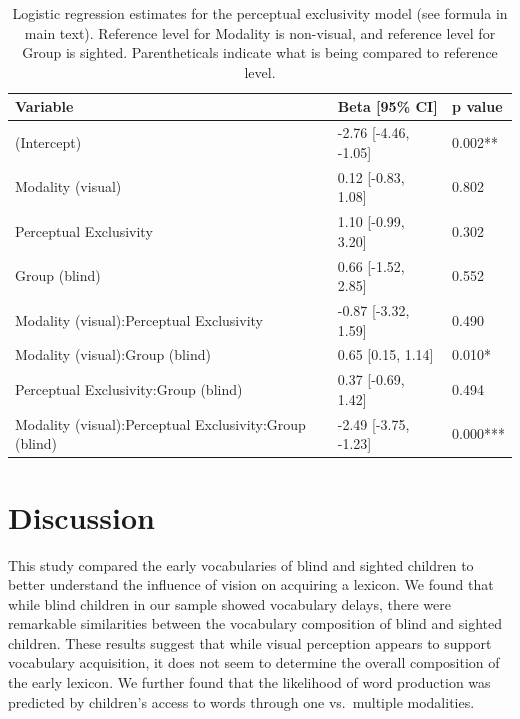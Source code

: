 \documentclass[
  man,floatsintext]{apa6}
\begin{document}
\begin{table}[H]

\caption{\label{tab:excl-table}Logistic regression estimates for the perceptual exclusivity model (see formula in main text). Reference level for Modality is non-visual, and reference level for Group is sighted. Parentheticals indicate what is being compared to reference level.}
\centering
\begin{tabular}[t]{l|l|l}
\hline
Variable & Beta [95\% CI] & p value\\
\hline
(Intercept) & -2.76 [-4.46, -1.05] & 0.002**\\
\hline
Modality (visual) & 0.12 [-0.83, 1.08] & 0.802\\
\hline
Perceptual Exclusivity & 1.10 [-0.99, 3.20] & 0.302\\
\hline
Group (blind) & 0.66 [-1.52, 2.85] & 0.552\\
\hline
Modality (visual):Perceptual Exclusivity & -0.87 [-3.32, 1.59] & 0.490\\
\hline
Modality (visual):Group (blind) & 0.65 [0.15, 1.14] & 0.010*\\
\hline
Perceptual Exclusivity:Group (blind) & 0.37 [-0.69, 1.42] & 0.494\\
\hline
Modality (visual):Perceptual Exclusivity:Group (blind) & -2.49 [-3.75, -1.23] & 0.000***\\
\hline
\end{tabular}
\end{table}

\hypertarget{discussion}{%
\section{Discussion}\label{discussion}}

This study compared the early vocabularies of blind and sighted children to better understand the influence of vision on acquiring a lexicon. We found that while blind children in our sample showed vocabulary delays, there were remarkable similarities between the vocabulary composition of blind and sighted children. These results suggest that while visual perception appears to support vocabulary acquisition, it does not seem to determine the overall composition of the early lexicon. We further found that the likelihood of word production was predicted by children's access to words through one vs.~multiple modalities.
\end{document}
